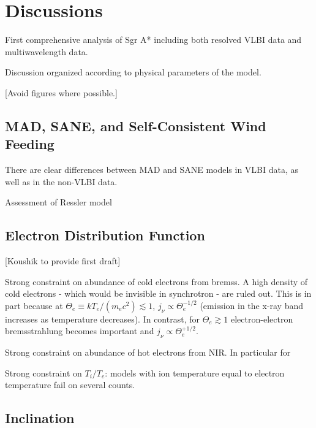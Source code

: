 \section{Discussions}\label{sec:discussions}

First comprehensive analysis of Sgr A* including both resolved VLBI data and multiwavelength data.

Discussion organized according to physical parameters of the model.

[Avoid figures where possible.]


\subsection{MAD, SANE, and Self-Consistent Wind Feeding}

There are clear differences between MAD and SANE models in VLBI data, as well as in the non-VLBI data.  

Assessment of Ressler model 


\subsection{Electron Distribution Function}

[Koushik to provide first draft]

Strong constraint on abundance of cold electrons from bremss.  A high density of cold electrons - which would be invisible in synchrotron - are ruled out.  This is in part because at $\Theta_e \equiv k T_e/(m_e c^2) \lesssim 1$, $j_\nu \propto \Theta_e^{-1/2}$ (emission in the x-ray band increases as temperature decreases).  In contrast, for $\Theta_e \gtrsim 1$ electron-electron bremsstrahlung becomes important and $j_\nu \propto \Theta_e^{+1/2}$.   

Strong constraint on abundance of hot electrons from NIR.  In particular for 

Strong constraint on $T_i/T_e$: models with ion temperature equal to electron temperature fail on several counts.

\subsection{Inclination}

